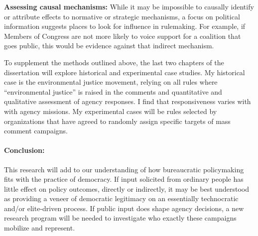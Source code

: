 \textbf{Assessing causal mechanisms:}
While it may be impossible to causally identify or attribute effects to normative or strategic mechanisms, 
a focus on political information suggests places to look for influence in rulemaking. For example, if Members of Congress are not more likely to voice support for a coalition that goes public, this would be evidence against that indirect mechanism.

To supplement the methods outlined above, the last two chapters of the dissertation will explore historical and experimental case studies. My historical case is the environmental justice movement, relying on all rules where ``environmental justice'' is raised in the comments and quantitative and qualitative assessment of agency responses. I find that responsiveness varies with with agency missions. My experimental cases will be rules selected by organizations that have agreed to randomly assign specific targets of mass comment campaigns. 


\paragraph{Conclusion:} This research will add to our understanding of how  bureaucratic policymaking fits with the practice of democracy.
If input solicited from ordinary people has little effect on policy outcomes, directly or indirectly, it may be best understood as providing a veneer of democratic legitimacy on an essentially technocratic and/or elite-driven process.
If public input does shape agency decisions, a new research program will be needed to investigate who exactly these campaigns mobilize and represent.